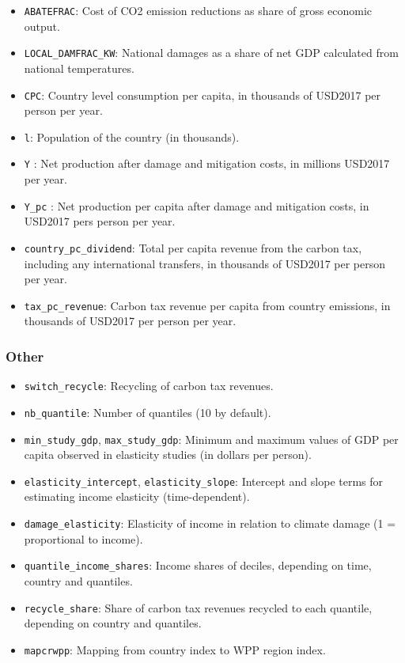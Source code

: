 \documentclass[
]{article}
\providecommand{\tightlist}{%
  \setlength{\itemsep}{0pt}\setlength{\parskip}{0pt}}
\begin{document}
\begin{itemize}
\tightlist
\item
  \texttt{ABATEFRAC}: Cost of CO2 emission reductions as share of gross
  economic output.
\item
  \texttt{LOCAL\_DAMFRAC\_KW}: National damages as a share of net GDP
  calculated from national temperatures.
\item
  \texttt{CPC}: Country level consumption per capita, in thousands of USD2017 per person per year.
\item
  \texttt{l}: Population of the country (in thousands).
\item
  \texttt{Y} : Net production after damage and mitigation costs, in
  millions USD2017 per year.
  \item
  \texttt{Y\_pc} : Net production per capita after damage and mitigation costs, in
  USD2017 pers person per year.
\item
  \texttt{country\_pc\_dividend}: Total per capita revenue from the
  carbon tax, including any international transfers, in thousands of
  USD2017 per person per year.
\item
  \texttt{tax\_pc\_revenue}: Carbon tax revenue per capita from country
  emissions, in thousands of USD2017 per person per year.
\end{itemize}

\subsubsection{Other}\label{other}

\begin{itemize}
\tightlist
\item
  \texttt{switch\_recycle}: Recycling of carbon tax revenues.
\item
  \texttt{nb\_quantile}: Number of quantiles (10 by default).
\item
  \texttt{min\_study\_gdp}, \texttt{max\_study\_gdp}: Minimum and
  maximum values of GDP per capita observed in elasticity studies (in
  dollars per person).
\item
  \texttt{elasticity\_intercept}, \texttt{elasticity\_slope}: Intercept
  and slope terms for estimating income elasticity (time-dependent).
\item
  \texttt{damage\_elasticity}: Elasticity of income in relation to
  climate damage (1 = proportional to income).

\item
  \texttt{quantile\_income\_shares}: Income shares of deciles, depending
  on time, country and quantiles.
\item
  \texttt{recycle\_share}: Share of carbon tax revenues recycled to each
  quantile, depending on country and quantiles.
\item
  \texttt{mapcrwpp}: Mapping from country index to WPP region index.
\end{itemize}
\end{document}

